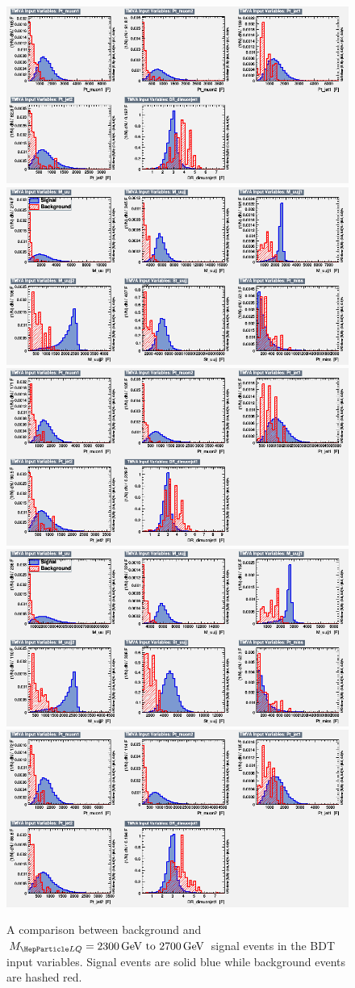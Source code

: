 \begin{figure}[H]
    {\includegraphics[width=.49\textwidth]{Images/Analysis/Results_LQToBMu_pair_uubj_BDTG_FullRun2_2023_01_25_020318/2500/variables_id_c2.png}}
    {\includegraphics[width=.49\textwidth]{Images/Analysis/Results_LQToBMu_pair_uubj_BDTG_FullRun2_2023_01_25_020318/2600/variables_id_c1.png}}
    {\includegraphics[width=.49\textwidth]{Images/Analysis/Results_LQToBMu_pair_uubj_BDTG_FullRun2_2023_01_25_020318/2600/variables_id_c2.png}}
    {\includegraphics[width=.49\textwidth]{Images/Analysis/Results_LQToBMu_pair_uubj_BDTG_FullRun2_2023_01_25_020318/2700/variables_id_c1.png}}
    {\includegraphics[width=.49\textwidth]{Images/Analysis/Results_LQToBMu_pair_uubj_BDTG_FullRun2_2023_01_25_020318/2700/variables_id_c2.png}}
    \caption{A comparison between background and $\MLQ = \SIrange{2300}{2700}{GeV}$ signal events in the BDT input variables. Signal events are solid blue while background events are hashed red.}
    \label{figapp:variables5}
\end{figure}

